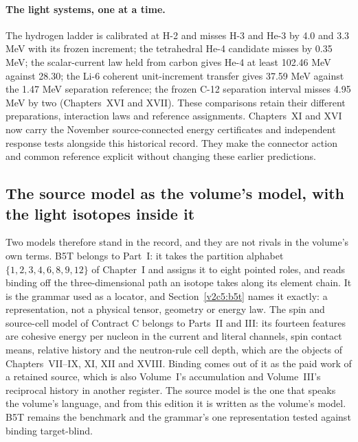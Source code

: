 \paragraph{The light systems, one at a time.} The hydrogen ladder is calibrated at H-2 and misses H-3 and He-3 by 4.0 and 3.3 MeV with its frozen increment; the tetrahedral He-4 candidate misses by 0.35 MeV; the scalar-current law held from carbon gives He-4 at least 102.46 MeV against 28.30; the Li-6 coherent unit-increment transfer gives 37.59 MeV against the 1.47 MeV separation reference; the frozen C-12 separation interval misses 4.95 MeV by two (Chapters~XVI and XVII). These comparisons retain their different preparations, interaction laws and reference assignments. Chapters~XI and XVI now carry the November source-connected energy certificates and independent response tests alongside this historical record. They make the connector action and common reference explicit without changing these earlier predictions.

\subsection{The source model as the volume's model, with the light isotopes inside it}
\label{v2c5:sourcemodel}

Two models therefore stand in the record, and they are not rivals in the volume's own terms. B5T belongs to Part~I: it takes the partition alphabet $\{1,2,3,4,6,8,9,12\}$ of Chapter~I and assigns it to eight pointed roles, and reads binding off the three-dimensional path an isotope takes along its element chain. It is the grammar used as a locator, and Section~\ref{v2c5:b5t} names it exactly: a representation, not a physical tensor, geometry or energy law. The spin and source-cell model of Contract C belongs to Parts~II and III: its fourteen features are cohesive energy per nucleon in the current and literal channels, spin contact means, relative history and the neutron-rule cell depth, which are the objects of Chapters~VII--IX, XI, XII and XVIII. Binding comes out of it as the paid work of a retained source, which is also Volume~I's accumulation and Volume~III's reciprocal history in another register. The source model is the one that speaks the volume's language, and from this edition it is written as the volume's model. B5T remains the benchmark and the grammar's one representation tested against binding target-blind.

